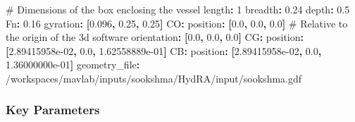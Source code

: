 \documentclass[
  letterpaper,
  DIV=11,
  numbers=noendperiod]{scrreprt}
\newenvironment{Shaded}{\begin{snugshade}}{\end{snugshade}}
\newcommand{\AttributeTok}[1]{\textcolor[rgb]{0.40,0.45,0.13}{#1}}
\newcommand{\CommentTok}[1]{\textcolor[rgb]{0.37,0.37,0.37}{#1}}
\newcommand{\DecValTok}[1]{\textcolor[rgb]{0.68,0.00,0.00}{#1}}
\newcommand{\FloatTok}[1]{\textcolor[rgb]{0.68,0.00,0.00}{#1}}
\newcommand{\FunctionTok}[1]{\textcolor[rgb]{0.28,0.35,0.67}{#1}}
\newcommand{\KeywordTok}[1]{\textcolor[rgb]{0.00,0.23,0.31}{\textbf{#1}}}
\begin{document}
\begin{Shaded}
\begin{Highlighting}[]
\CommentTok{\# Dimensions of the box enclosing the vessel}
\FunctionTok{length}\KeywordTok{:}\AttributeTok{ }\DecValTok{1}
\FunctionTok{breadth}\KeywordTok{:}\AttributeTok{ }\FloatTok{0.24}
\FunctionTok{depth}\KeywordTok{:}\AttributeTok{ }\FloatTok{0.5}
\FunctionTok{Fn}\KeywordTok{:}\AttributeTok{ }\FloatTok{0.16}
\FunctionTok{gyration}\KeywordTok{:}\AttributeTok{ }\KeywordTok{[}\FloatTok{0.096}\KeywordTok{,}\AttributeTok{ }\FloatTok{0.25}\KeywordTok{,}\AttributeTok{ }\FloatTok{0.25}\KeywordTok{]}
\FunctionTok{CO}\KeywordTok{:}
\AttributeTok{  }\FunctionTok{position}\KeywordTok{:}\AttributeTok{ }\KeywordTok{[}\FloatTok{0.0}\KeywordTok{,}\AttributeTok{ }\FloatTok{0.0}\KeywordTok{,}\AttributeTok{ }\FloatTok{0.0}\KeywordTok{]}\CommentTok{ \# Relative to the origin of the 3d software}
\AttributeTok{  }\FunctionTok{orientation}\KeywordTok{:}\AttributeTok{ }\KeywordTok{[}\FloatTok{0.0}\KeywordTok{,}\AttributeTok{ }\FloatTok{0.0}\KeywordTok{,}\AttributeTok{ }\FloatTok{0.0}\KeywordTok{]}
\FunctionTok{CG}\KeywordTok{:}
\AttributeTok{  }\FunctionTok{position}\KeywordTok{:}\AttributeTok{ }\KeywordTok{[}\FloatTok{2.89415958e{-}02}\KeywordTok{,}\AttributeTok{ }\FloatTok{0.0}\KeywordTok{,}\AttributeTok{ }\FloatTok{1.62558889e{-}01}\KeywordTok{]}
\FunctionTok{CB}\KeywordTok{:}
\AttributeTok{  }\FunctionTok{position}\KeywordTok{:}\AttributeTok{ }\KeywordTok{[}\FloatTok{2.89415958e{-}02}\KeywordTok{,}\AttributeTok{ }\FloatTok{0.0}\KeywordTok{,}\AttributeTok{ }\FloatTok{1.36000000e{-}01}\KeywordTok{]}
\AttributeTok{  }
\FunctionTok{geometry\_file}\KeywordTok{:}\AttributeTok{ /workspaces/mavlab/inputs/sookshma/HydRA/input/sookshma.gdf}
\end{Highlighting}
\end{Shaded}

\subsubsection*{Key Parameters}\label{key-parameters-1}
\end{document}
